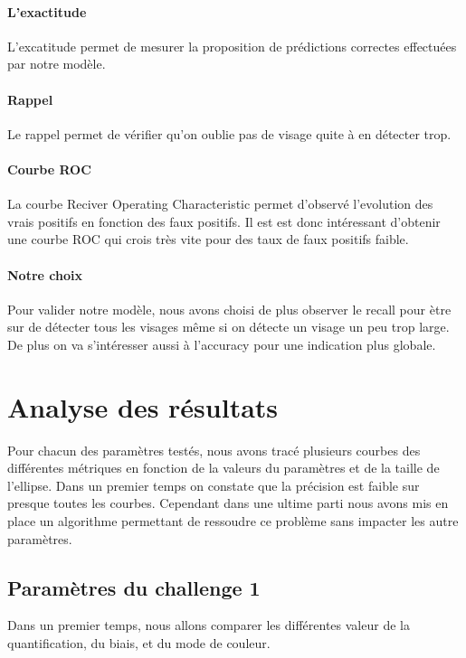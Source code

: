 \documentclass[a4paper,12pt, openany]{book}
\theoremstyle{break}
\begin{document}
\paragraph{L'exactitude}
L'excatitude permet de mesurer la proposition de prédictions correctes effectuées par notre modèle.

\paragraph{Rappel}
Le rappel permet de vérifier qu'on oublie pas de visage quite à en détecter trop.

\paragraph{Courbe ROC}
La courbe Reciver Operating Characteristic permet d'observé l'evolution des vrais positifs en fonction des faux positifs. Il est est donc intéressant d'obtenir une courbe ROC qui crois très vite pour des taux de faux positifs faible.

\paragraph{Notre choix}
Pour valider notre modèle, nous avons choisi de plus observer le recall pour ètre sur de détecter tous les visages même si on détecte un visage un peu trop large. De plus on va s'intéresser aussi à l'accuracy pour une indication plus globale.

\section{Analyse des résultats}
Pour chacun des paramètres testés, nous avons tracé plusieurs courbes des différentes métriques en fonction de la valeurs du paramètres et de la taille de l'ellipse.
Dans un premier temps on constate que la précision est faible sur presque toutes les courbes. Cependant dans une ultime parti nous avons mis en place un algorithme permettant de ressoudre ce problème sans impacter les autre paramètres.

\subsection{Paramètres du challenge 1}
Dans un premier temps, nous allons comparer les différentes valeur de la quantification, du biais, et du mode de couleur.
\end{document}
